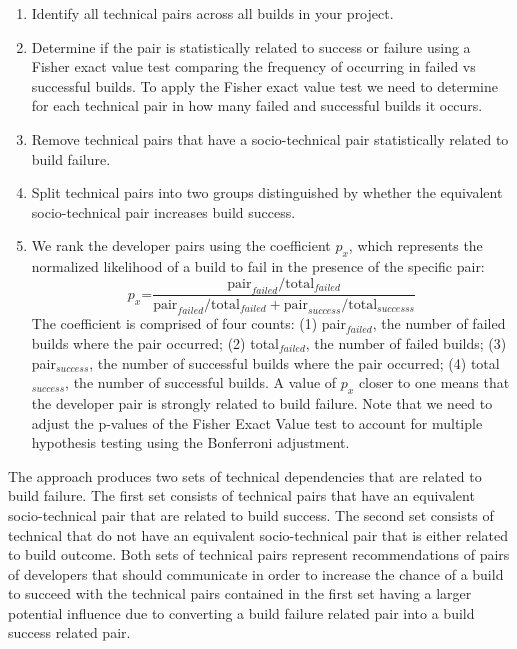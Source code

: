 \documentclass[conference]{IEEEtran}
\begin{document}
\begin{enumerate}
\item Identify all technical pairs across all builds in your project.
\item Determine if the pair is statistically related to success or failure using a Fisher exact value test comparing the frequency of occurring in failed vs successful builds. To apply the Fisher exact value test we need to determine for each technical pair in how many failed and successful builds it occurs.

\item Remove technical pairs that have a socio-technical pair statistically related to build failure.
\item Split technical pairs into two groups distinguished by whether the equivalent socio-technical pair increases build success.
\item We rank the developer pairs using the coefficient $p_x$,
which represents the normalized likelihood of a build
to fail in the presence of the specific pair:
$$
p_x\text{=}\frac{ \text{pair}_{failed} / \text{total}_{failed} }
                     { \text{pair}_{failed} / \text{total}_{failed} + \text{pair}_{success} / \text{total}_{successs}}
$$
The coefficient is comprised of four counts: (1) pair$_{failed}$, the number of failed builds where the pair occurred; (2) total$_{failed}$, the number of failed builds; (3) pair$_{success}$, the number of successful builds where the pair occurred; (4) total$_{success}$, the number of successful builds.
A value of $p_x$ closer to one means that the developer pair is strongly related to build
failure. 
Note that we need to adjust the p-values of the Fisher Exact Value test to account for multiple hypothesis testing using the Bonferroni adjustment.
\end{enumerate}

The approach produces two sets of technical dependencies that are related to build failure.
The first set consists of technical pairs that have an equivalent socio-technical pair that are related to build success.
The second set consists of technical that do not have an equivalent socio-technical pair that is either related to build outcome.
Both sets of technical pairs represent recommendations of pairs of developers that should communicate in order to increase the chance of a build to succeed with the technical pairs contained in the first set having a larger potential influence due to converting a build failure related pair into a build success related pair.
\end{document}
